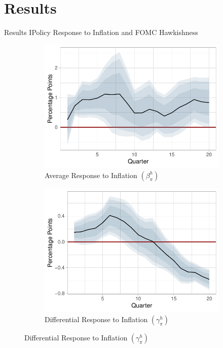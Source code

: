 \documentclass[11pt,pdf,aspectratio=129]{beamer}
\begin{document}




\section{Results}

\begin{frame}{Results I}{Policy Response to Inflation and FOMC Hawkishness}

    \begin{figure}[!htbp]\centering
        \label{fig:LP}
        \begin{subfigure}[b]{0.48\textwidth}
            \centering
            \caption{Average Response to Inflation $\left(\beta_\pi^h\right)$}
            \label{fig:average_inflation}
            \includegraphics[width=\linewidth]{average_inflation.pdf}
        \end{subfigure}
        \hfill
        \begin{subfigure}[b]{0.48\textwidth}
            \centering 
            \caption{Differential Response to Inflation $\left(\gamma_\pi^h\right)$}
            \label{fig:differential_inflation}
            \includegraphics[width=\linewidth]{differential_inflation.pdf}

\end{subfigure}
\end{figure}
\end{frame}
\end{document}
